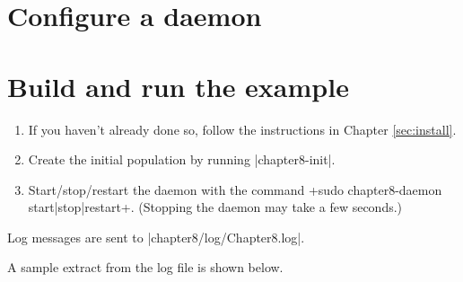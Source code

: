 \documentclass[a4paper,10pt]{report}
\begin{document}


\section{Configure a daemon}
\label{sec:daemon3}



\section{Build and run the example}
\label{sec:run3}

\begin{enumerate}
\item If you haven't already done so, follow the instructions in Chapter 
\ref{sec:install}.
\item Create the initial population by running |chapter8-init|.
\item Start/stop/restart the daemon with the command
\UndefineShortVerb{\|}
\DefineShortVerb{\+}
+sudo chapter8-daemon start|stop|restart+.
\UndefineShortVerb{\+}
\DefineShortVerb{\|}
(Stopping the daemon may take a few seconds.)
\end{enumerate}

Log messages are sent to |chapter8/log/Chapter8.log|.

A sample extract from the log file is shown below.
\end{document}
